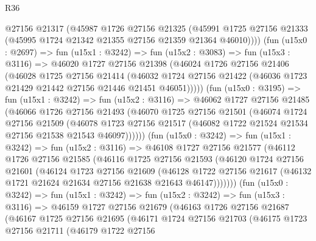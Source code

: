 \begin{lexlean}{R36}
\begin{coremodule}
          @27156
          @21317
          (@45987
            @1726
            @27156
            @21325
            (@45991 @1725 @27156 @21333 (@45995 @1724 @21342 @21355 @27156 @21359 @21364 @46010))))
        (fun (u15x0 : @2697) =>
        fun (u15x1 : @3242) =>
        fun (u15x2 : @3083) =>
        fun (u15x3 : @3116) =>
        @46020
          @1727
          @27156
          @21398
          (@46024
            @1726
            @27156
            @21406
            (@46028
              @1725
              @27156
              @21414
              (@46032
                @1724
                @27156
                @21422
                (@46036 @1723 @21429 @21442 @27156 @21446 @21451 @46051)))))
        (fun (u15x0 : @3195) =>
        fun (u15x1 : @3242) =>
        fun (u15x2 : @3116) =>
        @46062
          @1727
          @27156
          @21485
          (@46066
            @1726
            @27156
            @21493
            (@46070
              @1725
              @27156
              @21501
              (@46074
                @1724
                @27156
                @21509
                (@46078
                  @1723
                  @27156
                  @21517
                  (@46082 @1722 @21524 @21534 @27156 @21538 @21543 @46097))))))
        (fun (u15x0 : @3242) =>
        fun (u15x1 : @3242) =>
        fun (u15x2 : @3116) =>
        @46108
          @1727
          @27156
          @21577
          (@46112
            @1726
            @27156
            @21585
            (@46116
              @1725
              @27156
              @21593
              (@46120
                @1724
                @27156
                @21601
                (@46124
                  @1723
                  @27156
                  @21609
                  (@46128
                    @1722
                    @27156
                    @21617
                    (@46132 @1721 @21624 @21634 @27156 @21638 @21643 @46147)))))))
        (fun (u15x0 : @3242) =>
        fun (u15x1 : @3242) =>
        fun (u15x2 : @3242) =>
        fun (u15x3 : @3116) =>
        @46159
          @1727
          @27156
          @21679
          (@46163
            @1726
            @27156
            @21687
            (@46167
              @1725
              @27156
              @21695
              (@46171
                @1724
                @27156
                @21703
                (@46175
                  @1723
                  @27156
                  @21711
                  (@46179
                    @1722
                    @27156

\end{coremodule}
\end{lexlean}
